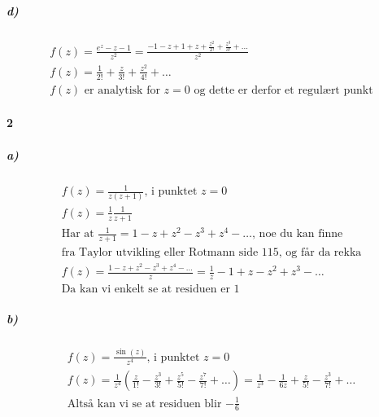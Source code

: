 \documentclass[11pt, A4paper,norsk]{article}
\begin{document}
			\subparagraph{d)}
				\begin{gather*}
f(z) = \frac{e^z - z - 1}{z^2} = \frac{- 1 - z + 1 + z + \frac{z^2}{2!} + \frac{z^3}{3!} + \dots}{z^2} \\
f(z) = \frac{1}{2!} + \frac{z}{3!} + \frac{z^2}{4!} + \dots \\
\text{$f(z)$ er analytisk for $z = 0$ og dette er derfor et regulært punkt}
				\end{gather*}









		\paragraph{2}
			\subparagraph{a)}
				\begin{gather*}
f(z) = \frac{1}{z(z + 1)} \text{, i punktet $z = 0$}\\
f(z) = \frac{1}{z} \frac{1}{z + 1} \\
\text{Har at $\frac{1}{z + 1} = 1 - z + z^2 - z^3 + z^4 - \dots$, noe du kan finne} \\
\text{fra Taylor utvikling eller Rotmann side $115$, og får da rekka} \\
f(z) = \frac{1 - z + z^2 - z^3 + z^4 - \dots}{z} = \frac{1}{z} - 1 + z - z^2 + z^3 - \dots \\
\text{Da kan vi enkelt se at residuen er $1$}
				\end{gather*}










			\subparagraph{b)}
				\begin{gather*}
f(z) = \frac{\sin(z)}{z^4} \text{, i punktet $z = 0$} \\
f(z) = \frac{1}{z^4} \left( \frac{z}{1!} - \frac{z^3}{3!} + \frac{z^5}{5!} - \frac{z^7}{7!} + \dots \right) = \frac{1}{z^3} - \frac{1}{6z} + \frac{z}{5!} - \frac{z^3}{7!} + \dots \\
\text{Altså kan vi se at residuen blir $- \frac{1}{6}$}
				\end{gather*}
\end{document}
